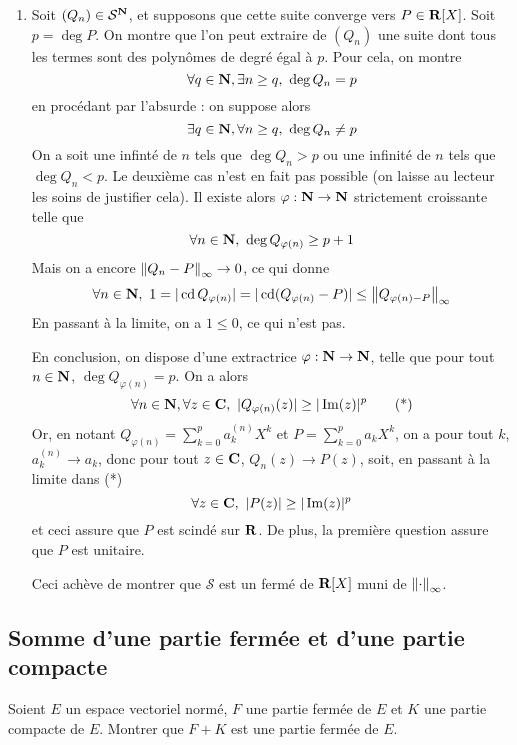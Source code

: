\begin{correction}
\begin{enumerate}
        \item Soit $(Q_n)\in\mathcal S^{\operatorname{\mathbf{N}}}$, et supposons que cette suite converge vers $P\in\operatorname{\mathbf{R}}[X]$.
        Soit $p=\deg P$. 
        On montre que l'on peut extraire de $(Q_n)$ une suite dont tous les termes sont des polynômes de degré égal à $p$.
        Pour cela, on montre 
        \[
            \forall q\in\operatorname{\mathbf{N}}, \exists n\geq q,\ \deg Q_n=p    
        \]
        en procédant par l'absurde : on suppose alors 
        \[
            \exists q\in\operatorname{\mathbf{N}}, \forall n\geq q,\ \deg Q_n\neq p
        \]
        On a soit une infinté de $n$ tels que $\deg Q_n > p$ ou une infinité de $n$ tels que $\deg Q_n < p$. 
        Le deuxième cas n'est en fait pas possible (on laisse au lecteur les soins de justifier cela). 
        Il existe alors $\varphi : \operatorname{\mathbf{N}}\to\operatorname{\mathbf{N}}$ strictement croissante telle que 
        \[
            \forall n\in\operatorname{\mathbf{N}},\ \deg Q_{\varphi(n)}\geq p + 1
        \]
        Mais on a encore $\left\lVert Q_n-P\right\rVert_\infty\to 0$, ce qui donne 
        \[
            \forall n\in\operatorname{\mathbf{N}},\ 1=|\operatorname{cd} Q_{\varphi(n)}|=|\operatorname{cd}(Q_{\varphi(n)}-P)|\leq \left\lVert Q_{\varphi(n)-P}\right\rVert_\infty
        \]
        En passant à la limite, on a $1\leq 0$, ce qui n'est pas. 

        En conclusion, on dispose d'une extractrice $\varphi:\operatorname{\mathbf{N}}\to\operatorname{\mathbf{N}}$, telle que pour tout $n\in\operatorname{\mathbf{N}}$, $\deg Q_{\varphi(n)}=p$.
        On a alors 
        \[
            \forall n\in\N,\forall z\in\C,\ |Q_{\varphi(n)}(z)|\geq|\Im(z)|^p    \tag*{(*)}
        \]
        Or, en notant $Q_{\varphi(n)}=\sum_{k=0}^pa_k^{(n)}X^k$ et $P=\sum_{k=0}^pa_kX^k$, on a pour tout $k$, $a_k^{(n)}\to a_k$, donc pour tout $z\in\operatorname{\mathbf{C}}$, $Q_n(z)\to P(z)$,
        soit, en passant à la limite dans (*)
        \[
            \forall z\in\operatorname{\mathbf{C}},\ |P(z)|\geq|\operatorname{Im}(z)|^p
        \]
        et ceci assure que $P$ est scindé sur $\operatorname{\mathbf{R}}$. 
        De plus, la première question assure que $P$ est unitaire.
        
        Ceci achève de montrer que $\mathcal S$ est un fermé de $\operatorname{\mathbf{R}}[X]$ muni de $\left\lVert \cdot\right\rVert_\infty$.
    \end{enumerate}
\end{correction}


\subsection{Somme d'une partie fermée et d'une partie compacte}
\begin{exercice}
	Soient $E$ un espace vectoriel normé, $F$ une partie fermée de $E$ et $K$ une partie compacte de $E$. Montrer que $F+K$ est une partie fermée de $E$.
\end{exercice}

